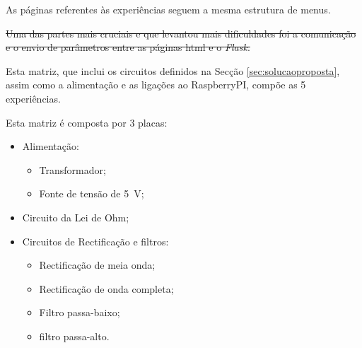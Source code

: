 As páginas referentes às experiências seguem a mesma estrutura de menus.

\sout{Uma das partes mais cruciais e que levantou mais dificuldades foi a comunicação e o envio de parâmetros entre as páginas \acrshort{html} e o \textit{Flask}.}

Esta matriz, que inclui os circuitos definidos na Secção \ref{sec:solucaoproposta}, assim como a alimentação e as ligações ao \gls{RaspberryPI}, compõe as 5 experiências.

Esta matriz é composta por 3 placas:
\begin{itemize}
	\item Alimentação:
	      \begin{itemize}
		      \item Transformador;
		      \item Fonte de tensão de \SI{5}{\volt};
	      \end{itemize}
	\item Circuito da Lei de Ohm;
	\item Circuitos de Rectificação e filtros:
	      \begin{itemize}
		      \item Rectificação de meia onda;
		      \item Rectificação de onda completa;
		      \item Filtro passa-baixo;
		      \item filtro passa-alto.
	      \end{itemize}
\end{itemize}